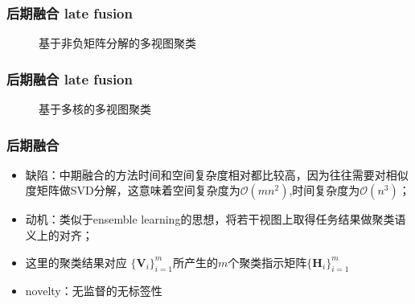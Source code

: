 \begin{frame}
    \frametitle{后期融合 late fusion}
    \begin{figure}[!ht]
\begin{center}
{
\centering
{}
\caption{基于非负矩阵分解的多视图聚类}
\label{figure_evaluation_objective one}
}
\end{center}
\end{figure}
\end{frame}

\begin{frame}
    \frametitle{后期融合 late fusion}
    \begin{figure}[!ht]
\begin{center}
{
\centering
{}
\caption{基于多核的多视图聚类}
}
\end{center}
\end{figure}
\end{frame}

\begin{frame}
    \frametitle{后期融合}
    \begin{itemize}
        \item 缺陷：中期融合的方法时间和空间复杂度相对都比较高，因为往往需要对相似度矩阵做SVD分解，这意味着空间复杂度为$\mathcal{O}(m n^2)$,时间复杂度为$\mathcal{O}( n^3)$；
        \item 动机：类似于ensemble learning的思想，将若干视图上取得任务结果做聚类语义上的对齐；
        \item 这里的聚类结果对应 $\{\mathbf{V}_{i}\}_{i=1}^{m}$所产生的$m$个聚类指示矩阵$\{\mathbf{H}_{i}\}_{i=1}^{m}$
        \item novelty：无监督的无标签性      
    \end{itemize}      
\end{frame}


